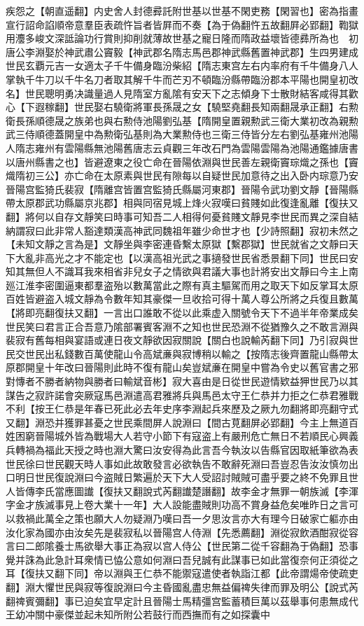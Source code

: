 疾怨之【朝直遥翻】内史舍人封德彛託附世基以世基不閑吏務【閑習也】密為指畫宣行詔命諂順帝意羣臣表疏忤旨者皆屛而不奏【為于偽翻忤五故翻屛必郢翻】鞫獄用灋多峻文深詆論功行賞則抑削就薄故世基之寵日隆而隋政益壞皆德彞所為也　初唐公李淵娶於神武肅公竇毅【神武郡名隋志馬邑郡神武縣舊置神武郡】生四男建成世民玄覇元吉一女適太子千牛備身臨汾柴紹【隋志東宫左右内率府有千牛備身八人掌執千牛刀以千牛名刀者取其解千牛而芒刃不頓臨汾縣帶臨汾郡本平陽也開皇初改名】世民聰明勇决識量過人見隋室方亂隂有安天下之志傾身下士散財結客咸得其歡心【下遐稼翻】世民娶右驍衛將軍長孫晟之女【驍堅堯翻長知兩翻晟承正翻】右勲衛長孫順德晟之族弟也與右勲侍池陽劉弘基【隋開皇置親勲武三衛大業初改為親勲武三侍順德蓋開皇中為勲衛弘基則為大業勲侍也三衛三侍皆分左右劉弘基雍州池陽人隋志雍州有雲陽縣無池陽舊唐志云貞觀三年改石門為雲陽雲陽為池陽通鑑據唐書以唐州縣書之也】皆避遼東之役亡命在晉陽依淵與世民善左親衛竇琮熾之孫也【竇熾隋初三公】亦亡命在太原素與世民有隙每以自疑世民加意待之出入卧内琮意乃安晉陽宫監猗氏裴寂【隋離宫皆置宫監猗氏縣屬河東郡】晉陽令武功劉文靜【晉陽縣帶太原郡武功縣屬京兆郡】相與同宿見城上烽火寂嘆曰貧賤如此復逢亂離【復扶又翻】將何以自存文靜笑曰時事可知吾二人相得何憂貧賤文靜見李世民而異之深自結納謂寂曰此非常人豁達類漢高神武同魏祖年雖少命世才也【少詩照翻】寂初未然之【未知文靜之言為是】文靜坐與李密連昏繫太原獄【繫郡獄】世民就省之文靜曰天下大亂非高光之才不能定也【以漢高祖光武之事擿發世民省悉景翻下同】世民曰安知其無但人不識耳我來相省非兒女子之情欲與君議大事也計將安出文靜曰今主上南廵江淮李密圍逼東都羣盗殆以數萬當此之際有真主驅駕而用之取天下如反掌耳太原百姓皆避盗入城文靜為令數年知其豪傑一旦收拾可得十萬人尊公所將之兵復且數萬【將即亮翻復扶又翻】一言出口誰敢不從以此乘虚入關號令天下不過半年帝業成矣世民笑曰君言正合吾意乃隂部署賓客淵不之知也世民恐淵不從猶豫久之不敢言淵與裴寂有舊每相與宴語或連日夜文靜欲因寂關說【關白也說輸芮翻下同】乃引寂與世民交世民出私錢數百萬使龍山令高斌亷與寂博稍以輸之【按隋志後齊置龍山縣帶太原郡開皇十年改曰晉陽則此時不復有龍山矣豈斌亷在開皇中嘗為令史以舊官書之邪對慱者不勝者納物與勝者曰輸斌音彬】寂大喜由是日從世民遊情欵益狎世民乃以其謀告之寂許諾會突厥寇馬邑淵遣高君雅將兵與馬邑太守王仁恭并力拒之仁恭君雅戰不利【按王仁恭是年春已死此必去年史序李淵起兵來歷及之厥九勿翻將即亮翻守式又翻】淵恐并獲罪甚憂之世民乘間屏人說淵曰【間古莧翻屏必郢翻】今主上無道百姓困窮晉陽城外皆為戰場大人若守小節下有寇盗上有嚴刑危亡無日不若順民心興義兵轉禍為福此天授之時也淵大驚曰汝安得為此言吾今執汝以告縣官因取紙筆欲為表世民徐曰世民觀天時人事如此故敢發言必欲執告不敢辭死淵曰吾豈忍告汝汝慎勿出口明日世民復說淵曰今盗賊日繁遍於天下大人受詔討賊賊可盡乎要之終不免罪且世人皆傳李氏當應圖䜟【復扶又翻說式芮翻䜟楚譖翻】故李金才無罪一朝族滅【李渾字金才族滅事見上卷大業十一年】大人設能盡賊則功高不賞身益危矣唯昨日之言可以救禍此萬全之策也願大人勿疑淵乃嘆曰吾一夕思汝言亦大有理今日破家亡軀亦由汝化家為國亦由汝矣先是裴寂私以晉陽宫人侍淵【先悉薦翻】淵從寂飲酒酣寂從容言曰二郎隂養士馬欲舉大事正為寂以宫人侍公【世民第二從千容翻為于偽翻】恐事覺并誅為此急計耳衆情已恊公意如何淵曰吾兒誠有此謀事已如此當復奈何正須從之耳【復扶又翻下同】帝以淵與王仁恭不能禦寇遣使者執詣江都【此帝謂煬帝使疏吏翻】淵大懼世民與寂等復說淵曰今主昏國亂盡忠無益偏禆失律而罪及明公【說式芮翻禆賓彌翻】事已迫矣宜早定計且晉陽士馬精彊宫監蓄積巨萬以茲舉事何患無成代王幼冲關中豪傑並起未知所附公若鼓行而西撫而有之如探囊中